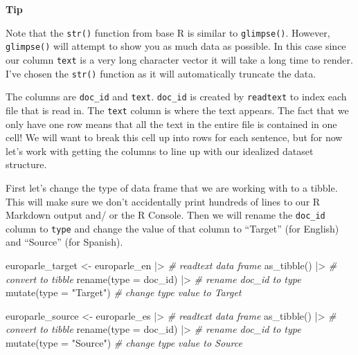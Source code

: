\documentclass[
  letterpaper,
  DIV=11,
  numbers=noendperiod]{scrreport}
\newenvironment{Shaded}{\begin{snugshade}}{\end{snugshade}}
\newcommand{\AttributeTok}[1]{\textcolor[rgb]{0.00,0.00,0.00}{#1}}
\newcommand{\CommentTok}[1]{\textcolor[rgb]{0.00,0.00,0.00}{\textit{#1}}}
\newcommand{\FunctionTok}[1]{\textcolor[rgb]{0.00,0.00,0.00}{#1}}
\newcommand{\NormalTok}[1]{\textcolor[rgb]{0.00,0.00,0.00}{#1}}
\newcommand{\OtherTok}[1]{\textcolor[rgb]{0.00,0.00,0.00}{#1}}
\newcommand{\SpecialCharTok}[1]{\textcolor[rgb]{0.00,0.00,0.00}{#1}}
\newcommand{\StringTok}[1]{\textcolor[rgb]{0.00,0.00,0.00}{#1}}
\theoremstyle{definition}
\theoremstyle{remark}
\begin{document}
\begin{tcolorbox}[enhanced jigsaw, breakable, arc=.35mm, leftrule=.75mm, rightrule=.15mm, colback=white, toprule=.15mm, bottomrule=.15mm, opacityback=0, left=2mm]

\textbf{ Tip}

Note that the \texttt{str()} function from base R is similar to
\texttt{glimpse()}. However, \texttt{glimpse()} will attempt to show you
as much data as possible. In this case since our column \texttt{text} is
a very long character vector it will take a long time to render. I've
chosen the \texttt{str()} function as it will automatically truncate the
data.

\end{tcolorbox}

The columns are \texttt{doc\_id} and \texttt{text}. \texttt{doc\_id} is
created by \texttt{readtext} to index each file that is read in. The
\texttt{text} column is where the text appears. The fact that we only
have one row means that all the text in the entire file is contained in
one cell! We will want to break this cell up into rows for each
sentence, but for now let's work with getting the columns to line up
with our idealized dataset structure.

First let's change the type of data frame that we are working with to a
tibble. This will make sure we don't accidentally print hundreds of
lines to our R Markdown output and/ or the R Console. Then we will
rename the \texttt{doc\_id} column to \texttt{type} and change the value
of that column to ``Target'' (for English) and ``Source'' (for Spanish).

\begin{Shaded}
\begin{Highlighting}[]
\NormalTok{europarle\_target }\OtherTok{\textless{}{-}}
\NormalTok{  europarle\_en }\SpecialCharTok{|\textgreater{}} \CommentTok{\# readtext data frame}
  \FunctionTok{as\_tibble}\NormalTok{() }\SpecialCharTok{|\textgreater{}} \CommentTok{\# convert to tibble}
  \FunctionTok{rename}\NormalTok{(}\AttributeTok{type =}\NormalTok{ doc\_id) }\SpecialCharTok{|\textgreater{}} \CommentTok{\# rename doc\_id to type}
  \FunctionTok{mutate}\NormalTok{(}\AttributeTok{type =} \StringTok{"Target"}\NormalTok{) }\CommentTok{\# change type value to \textquotesingle{}Target\textquotesingle{}}

\NormalTok{europarle\_source }\OtherTok{\textless{}{-}}
\NormalTok{  europarle\_es }\SpecialCharTok{|\textgreater{}} \CommentTok{\# readtext data frame}
  \FunctionTok{as\_tibble}\NormalTok{() }\SpecialCharTok{|\textgreater{}} \CommentTok{\# convert to tibble}
  \FunctionTok{rename}\NormalTok{(}\AttributeTok{type =}\NormalTok{ doc\_id) }\SpecialCharTok{|\textgreater{}} \CommentTok{\# rename doc\_id to type}
  \FunctionTok{mutate}\NormalTok{(}\AttributeTok{type =} \StringTok{"Source"}\NormalTok{) }\CommentTok{\# change type value to \textquotesingle{}Source\textquotesingle{}}
\end{Highlighting}
\end{Shaded}
\end{document}

